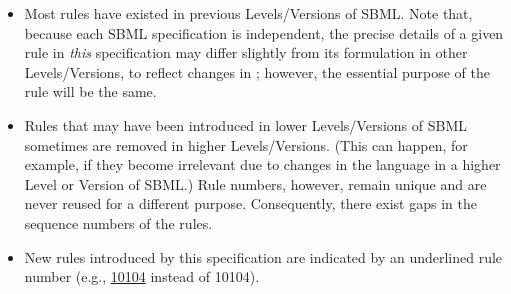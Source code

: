 \begin{itemize}
\item Most rules have existed in previous Levels/Versions of SBML.
  Note that, because each SBML specification is independent, the
  precise details of a given rule in \emph{this} specification may
  differ slightly from its formulation in other Levels/Versions,
  to reflect changes in \sbmlthree; however, the essential purpose
  of the rule will be the same.

\item Rules that may have been introduced in lower Levels/Versions
  of SBML sometimes are removed in higher Levels/Versions.  (This
  can happen, for example, if they become irrelevant due to
  changes in the language in a higher Level or Version of SBML.)
  Rule numbers, however, remain unique and are never reused for a
  different purpose.  Consequently, there exist gaps in the
  sequence numbers of the rules.

\item New rules introduced by this \sbmlthree specification are
  indicated by an underlined rule number (e.g., \underline{10104}
  instead of 10104).

\end{itemize}


